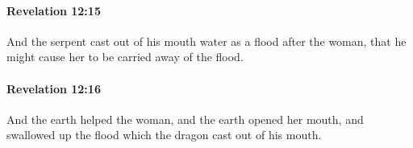		\paragraph{Revelation 12:15} %
			\label{REVELATIONNT-12-15}

			And the serpent cast out of his mouth water as a flood after the woman, that he might cause her to be carried away of the flood.

			\begin{framed}
			\scriptsize
				\begin{compactdesc}
					\item[SBLG] 
				\end{compactdesc}
			\end{framed}

		\paragraph{Revelation 12:16} %
			\label{REVELATIONNT-12-16}

			And the earth helped the woman, and the earth opened her mouth, and swallowed up the flood which the dragon cast out of his mouth.

